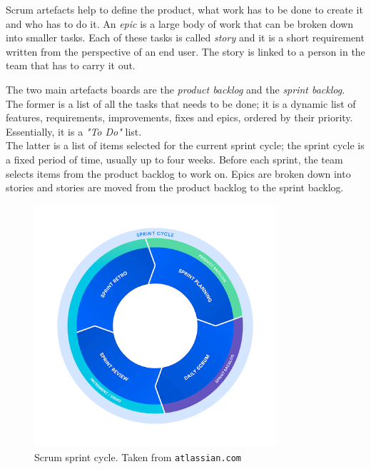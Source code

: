 Scrum artefacts help to define the product, what work has to be done to create it and who has to do it. An \textit{epic} is a large body of work that can be broken down into smaller tasks. Each of these tasks is called \textit{story} and it is a short requirement written from the perspective of an end user. The story is linked to a person in the team that has to carry it out.

The two main artefacts boards are the \textit{product backlog} and the \textit{sprint backlog}. \\
The former is a list of all the tasks that needs to be done; it is a dynamic list of features, requirements, improvements, fixes and epics, ordered by their priority. Essentially, it is a \textit{"To Do"} list.\\
The latter is a list of items selected for the current sprint cycle; the sprint cycle is a fixed period of time, usually up to four weeks. Before each sprint, the team selects items from the product backlog to work on. Epics are broken down into stories and stories are moved from the product backlog to the sprint backlog.~\cite{scrum-epic-stories}

\begin{figure}[t]
  \centering
  \includegraphics[width=0.8\textwidth]{chapters/02/assets/scrum}
  \caption{Scrum sprint cycle. Taken from \texttt{atlassian.com}}
  \label{fig:scrum-sprint-cycle}
\end{figure}

